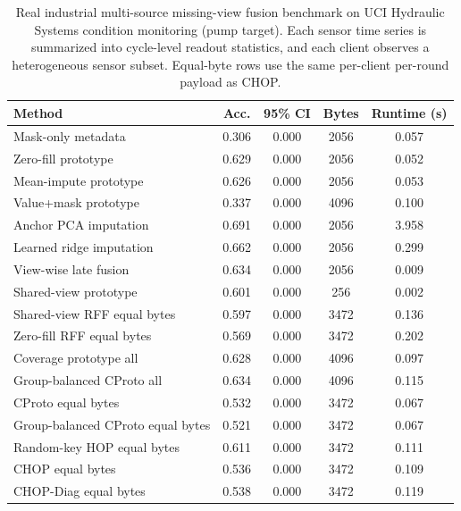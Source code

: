 \begin{table}[t]
\centering
\caption{Real industrial multi-source missing-view fusion benchmark on UCI Hydraulic Systems condition monitoring (pump target). Each sensor time series is summarized into cycle-level readout statistics, and each client observes a heterogeneous sensor subset. Equal-byte rows use the same per-client per-round payload as CHOP.}
\label{tab:if-hydraulic-fusion}
\scriptsize
\setlength{\tabcolsep}{3pt}
\renewcommand{\arraystretch}{0.94}
\begin{tabular}{lcccc}
\toprule
Method & Acc. & 95\% CI & Bytes & Runtime (s) \\
\midrule
Mask-only metadata & 0.306 & 0.000 & 2056 & 0.057 \\
Zero-fill prototype & 0.629 & 0.000 & 2056 & 0.052 \\
Mean-impute prototype & 0.626 & 0.000 & 2056 & 0.053 \\
Value+mask prototype & 0.337 & 0.000 & 4096 & 0.100 \\
Anchor PCA imputation & 0.691 & 0.000 & 2056 & 3.958 \\
Learned ridge imputation & 0.662 & 0.000 & 2056 & 0.299 \\
View-wise late fusion & 0.634 & 0.000 & 2056 & 0.009 \\
Shared-view prototype & 0.601 & 0.000 & 256 & 0.002 \\
Shared-view RFF equal bytes & 0.597 & 0.000 & 3472 & 0.136 \\
Zero-fill RFF equal bytes & 0.569 & 0.000 & 3472 & 0.202 \\
Coverage prototype all & 0.628 & 0.000 & 4096 & 0.097 \\
Group-balanced CProto all & 0.634 & 0.000 & 4096 & 0.115 \\
CProto equal bytes & 0.532 & 0.000 & 3472 & 0.067 \\
Group-balanced CProto equal bytes & 0.521 & 0.000 & 3472 & 0.067 \\
Random-key HOP equal bytes & 0.611 & 0.000 & 3472 & 0.111 \\
CHOP equal bytes & 0.536 & 0.000 & 3472 & 0.109 \\
CHOP-Diag equal bytes & 0.538 & 0.000 & 3472 & 0.119 \\
\bottomrule
\end{tabular}
\end{table}
